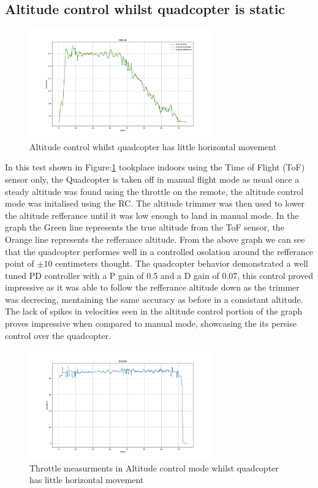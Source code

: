 \documentclass{report}
\begin{document}
\subsection*{Altitude control whilst quadcopter is static}
\begin{figure}[H]
  \centering
  \includegraphics[width=0.7\textwidth]{Pictures/Altitude_hold_indoors.png}
  \caption{Altitude control whilst quadcopter has little horizontal movement}
  \label{fig:Altitude_control_no_movement_altitude}
\end{figure}
In this test shown in Figure:\ref{fig:Altitude_control_no_movement_altitude} tookplace indoors using the Time of Flight (ToF) sensor only, the
Quadcopter is taken off in manual flight mode as usual once a steady altitude
was found using the throttle on the remote, the altitude control mode was
initalised using the RC. The altitude trimmer was then used to lower the
altitude refferance until it was low enough to land in manual mode. In the graph
the Green line represents the true altitude from the ToF sensor, the Orange line represents the
refferance altitude. 
From the above graph we can see that the quadcopter performes well in a
controlled osolation around the refferance point of \(\pm10\) centimeters
thought. The quadcopter behavior demonstrated a well tuned PD controller with a
P gain of 0.5 and a D gain of 0.07, this control proved impressive as it was
able to follow the refferance altitude down as the trimmer was decrecing,
mentaining the same accuracy as before in a consistant altitude. The lack of
spikes in velocities seen in the altitude control portion of the graph proves
impressive when compared to manual mode, showcasing the its persise control over
the quadcopter.

\begin{figure}[H]
  \centering
  \includegraphics[width=0.7\textwidth]{Pictures/Throttle_Altitude_hold_indoors.png}
  \caption{Throttle measurments in Altitude control mode whilst quadcopter has little horizontal movement}
  \label{fig:Altitude_control_no_movement_Throttle}
\end{figure}
\end{document}
